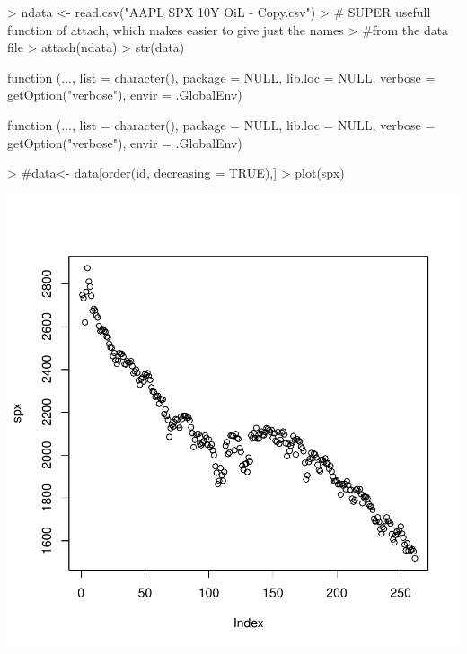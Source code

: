 \documentclass{article}
\begin{document}


\begin{Schunk}
\begin{Sinput}
> ndata <- read.csv("AAPL SPX 10Y OiL - Copy.csv")
> # SUPER usefull function of attach, which makes easier to give just the names 
> #from the data file
> attach(ndata)
> str(data)
\end{Sinput}
\begin{Soutput}
function (..., list = character(), package = NULL, lib.loc = NULL, verbose = getOption("verbose"), 
    envir = .GlobalEnv)  
\end{Soutput}
\begin{Soutput}
function (..., list = character(), package = NULL, lib.loc = NULL, verbose = getOption("verbose"), 
    envir = .GlobalEnv)  
\end{Soutput}
\begin{Sinput}
> #data<- data[order(id, decreasing = TRUE),]
> plot(spx)
\end{Sinput}
\end{Schunk}
\includegraphics{testingPDF-001}
\end{document}
